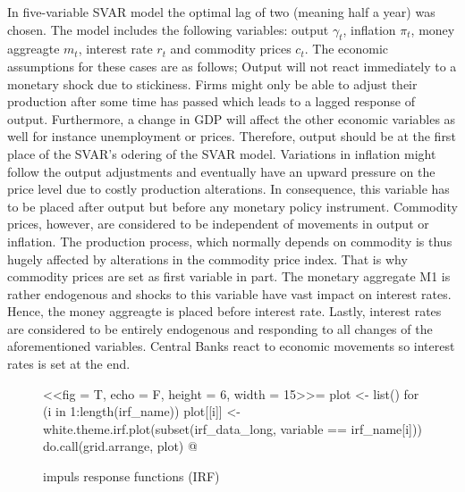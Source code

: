 \documentclass[11pt,a4paper]{report}
\begin{document}
In five-variable SVAR model the optimal lag of two (meaning half a year) was chosen.  The model includes the following variables:  output $\gamma_t$, inflation $\pi_t$, money aggreagte $m_t$, interest rate $r_t$ and commodity prices $c_t$. 
\newline
The economic assumptions for these cases are as follows; Output will not react immediately to a monetary shock due to stickiness. Firms might only be able to adjust their production after some time has passed which leads to a lagged response of output. Furthermore, a change in GDP will affect the other economic variables as well for instance unemployment or prices. Therefore, output should be at the first place of the SVAR's odering of the SVAR model. Variations in inflation might follow the output adjustments and eventually have an upward pressure on the price level due to costly production alterations. In consequence, this variable has to be placed after output but before any monetary policy instrument.
\newline
Commodity prices, however, are considered to be independent of movements in output or inflation. The  production  process,  which  normally  depends  on  commodity  is  thus  hugely  affected by alterations in the commodity price index. That is why commodity prices are set as first variable in part.
\newline
The monetary aggregate M1 is rather endogenous and shocks to this variable have vast impact on interest rates. Hence, the money aggreagte is placed before interest rate. Lastly, interest rates are considered to be entirely endogenous and responding to all changes of the aforementioned variables. Central Banks react to economic movements so interest rates is set at the end.

\begin{figure}[H]
\caption{impuls response functions (IRF)}
\label{irf}
\centering
<<fig = T, echo = F, height = 6, width = 15>>=
plot <- list()
for (i in 1:length(irf_name)){
plot[[i]] <- white.theme.irf.plot(subset(irf_data_long, variable == irf_name[i]))
}
do.call(grid.arrange, plot)
@
\end{figure}
\end{document}
